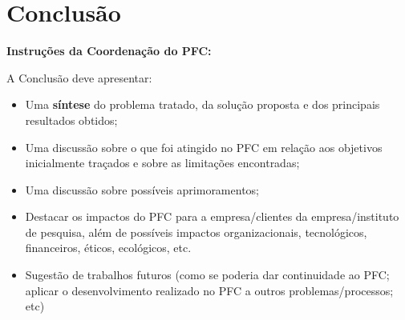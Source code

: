 \chapter{Conclusão}

\textbf{Instruções da Coordenação do PFC:}

A Conclusão deve apresentar:
\begin{itemize}
	\item Uma \textbf{síntese} do problema tratado, da solução proposta e dos principais resultados obtidos;
	\item Uma discussão sobre o que foi atingido no PFC em relação aos objetivos inicialmente traçados e sobre as limitações encontradas;
	\item Uma discussão sobre possíveis aprimoramentos;
	\item Destacar os impactos do PFC para a empresa/clientes da empresa/instituto de pesquisa, além de possíveis impactos organizacionais, tecnológicos, financeiros, éticos, ecológicos, etc. 
	\item Sugestão de trabalhos futuros (como se poderia dar continuidade ao PFC; aplicar o desenvolvimento realizado no PFC a outros problemas/processos; etc)
\end{itemize}


